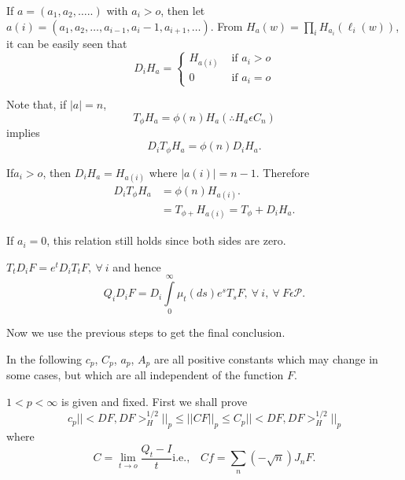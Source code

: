 If $a=(a_1,a_2, \ldots ..)$ with $a_i>o$, then let $a(i) = (a_1, a_2,
\ldots,a_{i-1}, a_i -1,a_{i+1}, \ldots)$. From  $H_a
(w)=\underset{i}{\prod} H_{a_i}(\ell_i (w))$, it can be easily seen that 
\begin{equation*}
  D_i H_a =
  \begin{cases}
    H_{a (i)} &\text{ if } a_i > o \\ 
    0 & \text{ if } a_i = o
  \end{cases}
\end{equation*}

Note that, if $| a | = n$,
$$
T_\phi H_a =\phi (n) H_a \left(\therefore H_a \epsilon  C_n\right)
$$
implies
$$
D_i T_\phi H_a = \phi (n) D_i H_a.
$$

If\pageoriginale $a_i >o$, then $D_i H_a = H_{a(i)}$ where $ | a (i) | = n-1$. Therefore
\begin{align*}
  D_i T_ \phi H_a &= \phi (n)H_{a(i)}.\\
  &=T_ {\phi +} H_{a(i)} = T_{\phi}+ D_i H_a.
\end{align*} 
 
 If $a_i = 0$, this relation still holds since both sides are zero.

 \begin{coro*}
   $T_t D_i F = e^t D_i T_t F, ~\forall~ i$ and hence  
   $$
   Q_i D_i F = D_i \int\limits^\infty_0 \mu_t (ds) e^s T_s F, ~\forall~
   i, ~\forall~ F \epsilon  \mathcal{P}. 
   $$
 \end{coro*}

\begin{step}%
  Now we use the previous steps to get the final conclusion.
\end{step} 
 
In the following $c_p$, $C_p$, $a_p$, $A_p$ are all positive constants
which may change in some cases, but which are all independent of the 
function $F$. 
 
 $1< p < \infty$ is given and fixed. First we shall prove 
\begin{equation*}
  c_p || < DF, DF >^{1/2}_H || _p \leq || CF ||_p \leq C_p || < DF, DF
  >^{1/2}_H ||_p \tag{1.18}\label{eq1.18}
\end{equation*}
where
$$
  C= \lim_{t \to o} \frac{Q_t - I}{t}  
  \text{i.e.,}  \quad  Cf = \sum_n  \left(-\sqrt{n}\right) J_n F.
 $$
 
